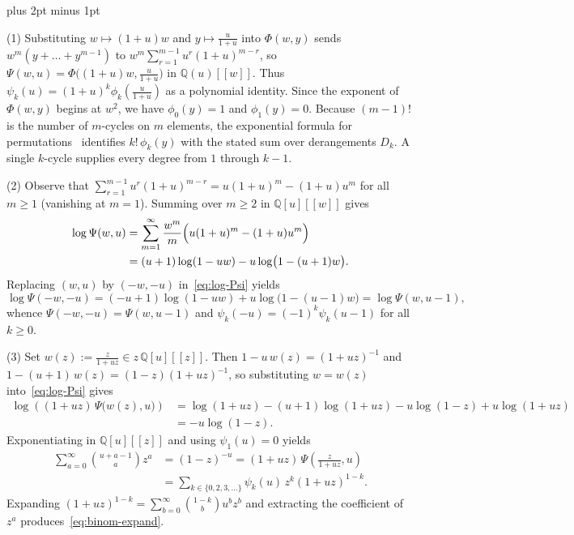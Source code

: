 \documentclass[11pt,letterpaper]{article}
\makeatletter
\renewenvironment{proof}[1][\proofname]{%
  \par\pushQED{\qed}\normalfont
  \topsep9pt plus 2pt minus 1pt\relax
  \trivlist\item[\hskip\labelsep\itshape #1\@addpunct{.}]\ignorespaces
}{\popQED\endtrivlist\@endpefalse}
\theoremstyle{result}
\theoremstyle{definition}
\theoremstyle{remark}
\newcommand{\QQ}{\mathbb{Q}}
\makeatother
\begin{document}
\begin{proof}
(1) Substituting $w\mapsto (1+u)w$ and $y\mapsto \frac{u}{1+u}$ into $\Phi(w,y)$ sends $w^m(y+\dots+y^{m-1})$ to $w^m\sum_{r=1}^{m-1}u^r(1+u)^{m-r}$, so $\Psi(w,u)=\Phi\bigl((1+u)w,\frac{u}{1+u}\bigr)$ in $\QQ(u)[[w]]$. Thus $\psi_k(u)=(1+u)^k\phi_k(\frac{u}{1+u})$ as a polynomial identity. Since the exponent of $\Phi(w,y)$ begins at $w^2$, we have $\phi_0(y)=1$ and $\phi_1(y)=0$. Because $(m-1)!$ is the number of $m$-cycles on $m$ elements, the exponential formula for permutations~\cite[Section~5.1]{StaEC2} identifies $k!\,\phi_k(y)$ with the stated sum over derangements $D_k$. A single $k$-cycle supplies every degree from $1$ through $k-1$.

(2) Observe that $\sum_{r=1}^{m-1} u^r(1+u)^{m-r}=u(1+u)^m-(1+u)u^m$ for all $m\ge 1$ (vanishing at $m=1$). Summing over $m\ge 2$ in $\QQ[u][[w]]$ gives
\begin{equation}\label{eq:log-Psi}
\begin{aligned}
\log\Psi(w,u)
  &= \sum_{m=1}^{\infty}\frac{w^m}{m}\Bigl(u(1+u)^m - (1+u)u^m\Bigr)\\
  &= (u+1)\log(1-uw) - u\log\bigl(1-(u+1)w\bigr).
\end{aligned}
\end{equation}
Replacing $(w,u)$ by $(-w,-u)$ in~\eqref{eq:log-Psi} yields
\[
\log\Psi(-w,-u) = (-u+1)\log(1-uw) + u\log\bigl(1-(u-1)w\bigr) = \log\Psi(w,u-1),
\]
whence $\Psi(-w,-u)=\Psi(w,u-1)$ and $\psi_k(-u)=(-1)^k\psi_k(u-1)$ for all $k\ge 0$.

(3) Set $w(z):=\frac{z}{1+uz}\in z\,\QQ[u][[z]]$. Then $1-u\,w(z)=(1+uz)^{-1}$ and $1-(u+1)\,w(z)=(1-z)(1+uz)^{-1}$, so substituting $w=w(z)$ into~\eqref{eq:log-Psi} gives
\begin{align*}
\log\!\left((1+uz)\,\Psi\bigl(w(z),u\bigr)\right)
&= \log(1+uz) - (u+1)\log(1+uz) - u\log(1-z) + u\log(1+uz) \\
&= -u\log(1-z).
\end{align*}
Exponentiating in $\QQ[u][[z]]$ and using $\psi_1(u)=0$ yields
\[
\begin{aligned}
\sum_{a=0}^{\infty}\binom{u+a-1}{a}z^a
  &= (1-z)^{-u} = (1+uz)\,\Psi\!\left(\frac{z}{1+uz},u\right)\\
  &= \sum_{k\in\{0,2,3,\dots\}} \psi_k(u)\, z^k (1+uz)^{1-k}.
\end{aligned}
\]
Expanding $(1+uz)^{1-k}=\sum_{b=0}^{\infty}\binom{1-k}{b}u^b z^b$ and extracting the coefficient of $z^a$ produces~\eqref{eq:binom-expand}.
\end{proof}
\end{document}
